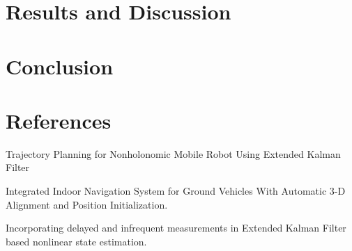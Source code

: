 \documentclass{ieeeaccess}
\begin{document}
\section{Results and Discussion}
\label{sec:res}


\section{Conclusion}
\label{sec:con}


\section{References}
Trajectory Planning for Nonholonomic Mobile Robot Using Extended Kalman Filter\par
Integrated Indoor Navigation System for Ground Vehicles With Automatic 3-D Alignment and Position Initialization.\par
Incorporating delayed and infrequent measurements in Extended Kalman Filter based nonlinear state estimation.\par

\EOD
\end{document}
